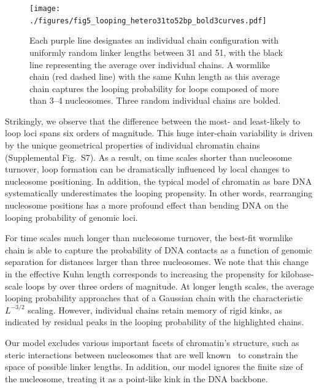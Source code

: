 \documentclass[%
 reprint,
superscriptaddress,
showpacs,preprintnumbers,
 amsmath,amssymb,
 aps,
 prl,
]{revtex4-1}
\begin{document}
\begin{figure}
    \centering
    \texttt{[image: ./figures/fig5\_looping\_hetero31to52bp\_bold3curves.pdf]}
    \caption{Each purple line designates an individual chain configuration with
    uniformly random linker lengths between 31 and \SI{51}{\basepair}, with the
    black line representing the average over individual chains. A wormlike chain
    (red dashed line) with the same Kuhn length as this average chain captures the
    looping probability for loops composed of more than 3--4 nucleosomes. Three
    random individual chains are bolded.}\label{fig:looping}
\end{figure}

Strikingly, we observe that the difference between the most- and least-likely to
    loop loci spans six orders of magnitude.
This huge inter-chain variability is driven by the unique geometrical properties
    of individual chromatin chains (Supplemental Fig.~S7).
As a result, on time scales shorter than nucleosome turnover, loop formation can
    be dramatically influenced by local changes to nucleosome positioning.
In addition, the typical model of chromatin as bare DNA systematically
    underestimates the looping propensity. In other words, rearranging
    nucleosome positions has a more profound effect than bending DNA on the
    looping probability of genomic loci.

For time scales much longer than nucleosome turnover, the best-fit wormlike
    chain is able to capture the probability of DNA contacts as a function of
    genomic separation for distances larger than three nucleosomes.
We note that this change in the effective Kuhn length corresponds to increasing
    the propensity for kilobase-scale loops by over three orders of magnitude.
At longer length scales, the average looping probability approaches that of a
    Gaussian chain with the characteristic $L^{-3/2}$ scaling.
However, individual chains retain memory of rigid kinks, as indicated by
    residual peaks in the looping probability of the highlighted chains.



Our model excludes various important facets of chromatin's structure, such as
    steric interactions between nucleosomes that are well known~\cite{widom1992}
    to constrain the space of possible linker lengths.
In addition, our model ignores the finite size of the nucleosome, treating it as
    a point-like kink in the DNA backbone.
\end{document}
